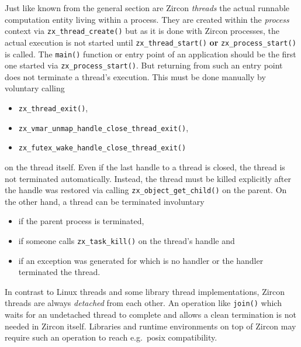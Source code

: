 Just like known from the general section are Zircon \textit{threads} the actual runnable computation entity living within a process.
They are created within the \textit{process} context via \texttt{zx\_thread\_create()} but as it is done with Zircon processes, the actual execution is not started until \texttt{zx\_thread\_start()} \textbf{or} \texttt{zx\_process\_start()} is called.
The \texttt{main()} function or entry point of an application should be the first one started via \texttt{zx\_process\_start()}.
But returning from such an entry point does not terminate a thread's execution.
This must be done manually by voluntary calling 
\begin{itemize}
    \item \texttt{zx\_thread\_exit()},
    \item \texttt{zx\_vmar\_unmap\_handle\_close\_thread\_exit()},
    \item \texttt{zx\_futex\_wake\_handle\_close\_thread\_exit()}
\end{itemize}
on the thread itself\cite{zircon-thread}.
Even if the last handle to a thread is closed, the thread is not terminated automatically.
Instead, the thread must be killed explicitly after the handle was restored via calling \texttt{zx\_object\_get\_child()} on the parent.
On the other hand, a thread can be terminated involuntary 
\begin{itemize}
    \item if the parent process is terminated,
    \item if someone calls \texttt{zx\_task\_kill()} on the thread's handle and
    \item if an exception was generated for which is no handler or the handler terminated the thread\cite{zircon-thread}. 
\end{itemize}

In contrast to Linux threads and some library thread implementations, Zircon threads are always \textit{detached} from each other.
An operation like \texttt{join()} which waits for an undetached thread to complete and allows a clean termination is not needed in Zircon itself.
Libraries and runtime environments on top of Zircon may require such an operation to reach e.g.\ \ac{posix} compatibility\cite{zircon-thread}.


